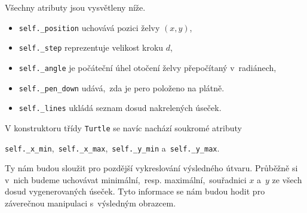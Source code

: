 Všechny atributy jsou vysvětleny níže.
\begin{itemize}
    \item \texttt{self.\_position} uchovává pozici želvy $(x,y)$,
    \item \texttt{self.\_step} reprezentuje velikost kroku $d$,
    \item \texttt{self.\_angle} je počáteční úhel otočení želvy přepočítaný v~radiánech,
    \item \texttt{self.\_pen\_down} udává,~zda je pero položeno na plátně.
    \item \texttt{self.\_lines} ukládá seznam dosud nakrelených úseček.
\end{itemize}
V konstruktoru třídy \texttt{Turtle} se navíc nachází soukromé atributy
\begin{center}
    \texttt{self.\_x\_min},~\texttt{self.\_x\_max},~\texttt{self.\_y\_min} a~\texttt{self.\_y\_max}.
\end{center}
Ty nám budou sloužit pro pozdější vykreslování výsledného útvaru. Průběžně si v~nich budeme uchovávat minimální,~resp. maximální,~souřadnici $x$ a~$y$ ze všech dosud vygenerovaných úseček. Tyto informace se nám budou hodit pro záverečnou manipulaci s~výsledným obrazcem.


